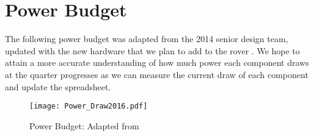 \appendixpagenumbering
\chapter{Power Budget} \label{App:PowerBudget}

The following power budget was adapted from the 2014 senior design team, updated with the new hardware that we plan to add to the rover \cite{rslrover2014}. We hope to attain a more accurate understanding of how much power each component draws at the quarter progresses as we can measure the current draw of each component and update the spreadsheet.

\begin{figure}[H]
\centerline{\texttt{[image: Power\_Draw2016.pdf]}}
\caption[]{Power Budget: Adapted from \cite{rslrover2014}}
\label{fig:PowerBudget}
\end{figure}
